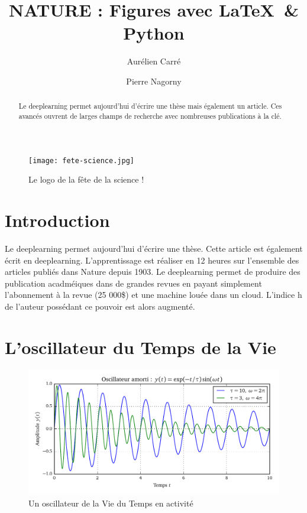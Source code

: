\documentclass[10pt,a4paper]{article}
\title{NATURE : Figures avec \LaTeX \ \& Python}
\author[1]{Aurélien Carré}
\author[1]{Pierre Nagorny}
\affil[1]{Laboratoire pour le Prix Nobel de la Mécatronique 2017}
\begin{document}
\maketitle

\begin{figure}[h]
\begin{center}
\texttt{[image: fete-science.jpg]}
\caption{Le logo de la fête de la science !}
\end{center}
\end{figure}

\begin{abstract}
    Le deeplearning permet aujourd'hui d'écrire une thèse mais également un article. Ces avancés ouvrent de larges champs de recherche avec nombreuses publications à la clé.
\end{abstract}

\section{Introduction}
Le deeplearning permet aujourd'hui d'écrire une thèse. Cette article est également écrit en deeplearning.
L'apprentissage est réaliser en 12 heures sur l'ensemble des articles publiés dans Nature depuis 1903.
Le deeplearning permet de produire des publication acadméiques dans de grandes revues en payant simplement l'abonnement à la revue (25 000\$) et une machine louée dans un cloud. L'indice h de l'auteur possédant ce pouvoir est alors augmenté.



\section{L'oscillateur du Temps de la Vie}
\begin{figure}[h]
\begin{center}
\includegraphics{Oscillateur}
\end{center}
\caption{Un oscillateur de la Vie du Temps en activité}
\end{figure}
\end{document}
